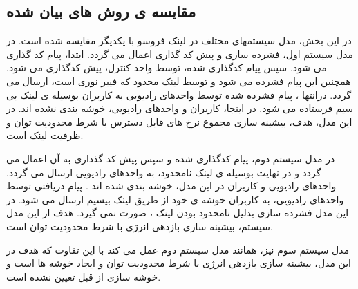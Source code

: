\subsection{مقایسه ی روش های بیان شده }

در این بخش، مدل سیستمهای مختلف در لینک فروسو  با یکدیگر مقایسه شده است.
در مدل سیستم اول،  فشرده سازی و پیش کد گذاری اعمال می گردد. ابتدا، پیام کد گذاری می شود. سپس پیام کدگذاری شده، توسط واحد کنترل، پیش کدگذاری می شود. همچنین این پیام فشرده می شود و توسط لینک محدود  که فیبر نوری است، ارسال می گردد.
درانتها ، پیام فشرده شده توسط واحدهای رادیویی به کاربران بوسیله ی لینک بی سیم فرستاده می شود.
در اینجا، کاربران و واحدهای رادیویی، خوشه بندی نشده اند.
در این مدل، هدف، بیشینه سازی مجموع نرخ های قابل دسترس با شرط محدودیت توان و ظرفیت لینک 
 است.  

در مدل سیستم دوم، پیام کدگذاری شده و سپس پیش کد گذداری به آن اعمال می گردد و در نهایت بوسیله ی لینک  نامحدود، به واحدهای رادیویی ارسال می گردد. واحدهای رادیویی و کاربران در این مدل، خوشه بندی شده اند . پیام دریافتی توسط واحدهای رادیویی، به کاربران خوشه ی خود از طریق لینک بیسیم ارسال می شود. در این مدل فشرده سازی بدلیل نامحدود بودن لینک ، صورت نمی گیرد. هدف از این مدل سیستم، بیشینه سازی بازدهی انرژی با شرط محدودیت توان است. 

 مدل سیستم سوم نیز، همانند مدل سیستم دوم عمل می کند با این تفاوت که هدف در این مدل، بیشینه سازی بازدهی انرژی با شرط محدودیت توان  و ایجاد خوشه  ها است و خوشه سازی از قبل تعیین نشده است.
